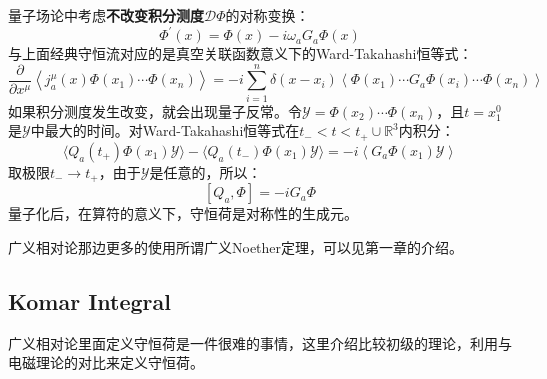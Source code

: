 量子场论中考虑\textbf{不改变积分测度$\mathcal{D}\Phi$}的对称变换：
\begin{equation}
	\Phi^{\prime}(x)=\Phi(x)-i\omega_aG_a\Phi(x)
\end{equation}
与上面经典守恒流对应的是真空关联函数意义下的Ward-Takahashi恒等式：
\begin{equation}
	\boxed{
		\frac\partial{\partial x^\mu}\left\langle j_a^\mu(x)\Phi(x_1)\cdots\Phi(x_n)\right\rangle   
		=-i\sum_{i=1}^n\delta(x-x_i)\left<\Phi(x_1)\cdots G_a\Phi(x_i)\cdots\Phi(x_n)\right>
	}
\end{equation}
如果积分测度发生改变，就会出现量子反常\cite{Bilal:2008qx}。令$\mathcal{Y}=\Phi(x_2)\cdots\Phi(x_n)$，且$t=x_1^0$是$\mathcal{Y}$中最大的时间。对Ward-Takahashi恒等式在${t_-<t<t_+}\cup \mathbb{R}^3$内积分：
\begin{equation}
	\langle Q_a(t_+)\Phi(x_1)\mathcal{Y}\rangle-\langle Q_a(t_-)\Phi(x_1)\mathcal{Y}\rangle=-i\left\langle G_a\Phi(x_1)\mathcal{Y}\right\rangle
\end{equation}
取极限$t_-\to t_+$，由于$\mathcal{Y}$是任意的，所以：
\begin{equation}
	\boxed{
	[Q_a,\Phi]=-iG_a\Phi }
\end{equation}
量子化后，在算符的意义下，守恒荷是对称性的生成元。

广义相对论那边更多的使用所谓广义Noether定理，可以见\cite{Compere:2019qed}第一章的介绍。
\subsection{Komar Integral}
广义相对论里面定义守恒荷是一件很难的事情，这里介绍比较初级的理论，利用与电磁理论的对比来定义守恒荷。

